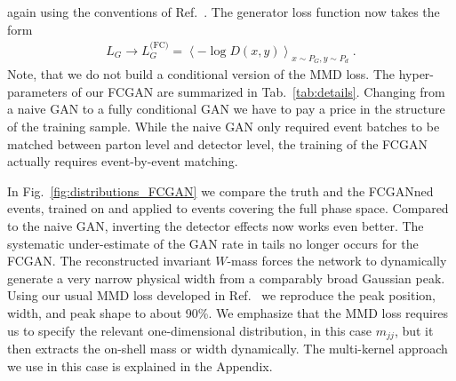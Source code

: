 again using the conventions of Ref.~\cite{gan_phasespace}. The
generator loss function now takes the form
%
\begin{align}
L_G\to L_G^\text{(FC)} = \left\langle - \log D\left(x,y\right) \right\rangle_{x \sim P_G, y \sim P_d} \; .
\label{eq:G_closs}
\end{align}
%
Note, that we do not build a conditional version of the MMD loss.  The
hyper-parameters of our FCGAN are summarized in
Tab.~\ref{tab:details}. Changing from a naive GAN to a fully
conditional GAN we have to pay a price in the structure of the
training sample. While the naive GAN only required event batches to be
matched between parton level and detector level, the training of the
FCGAN actually requires event-by-event matching.\medskip

In Fig.~\ref{fig:distributions_FCGAN} we compare the truth and the
FCGANned events, trained on and applied to events covering the full
phase space. Compared to the naive GAN, inverting the detector effects
now works even better. The systematic under-estimate of the GAN rate
in tails no longer occurs for the FCGAN.  The reconstructed invariant
$W$-mass forces the network to dynamically generate a very narrow
physical width from a comparably broad Gaussian peak. Using our usual
MMD loss developed in Ref.~\cite{gan_phasespace} we reproduce the peak
position, width, and peak shape to about 90\%. We emphasize that
the MMD loss requires us to specify the relevant one-dimensional
distribution, in this case $m_{jj}$, but it then extracts the on-shell
mass or width dynamically. The multi-kernel approach we use in this
case is explained in the Appendix.

